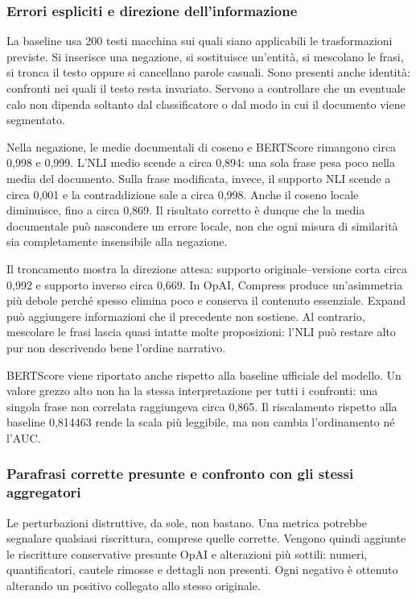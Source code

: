 \documentclass[11pt,a4paper]{article}
\begin{document}
\subsubsection{Errori espliciti e direzione dell'informazione}\label{errori-espliciti-e-direzione-dellinformazione}

La baseline usa 200 testi macchina sui quali siano applicabili le trasformazioni previste. Si inserisce una negazione, si sostituisce un'entità, si mescolano le frasi, si tronca il testo oppure si cancellano parole casuali. Sono presenti anche identità: confronti nei quali il testo resta invariato. Servono a controllare che un eventuale calo non dipenda soltanto dal classificatore o dal modo in cui il documento viene segmentato.

Nella negazione, le medie documentali di coseno e BERTScore rimangono circa 0,998 e 0,999. L'NLI medio scende a circa 0,894: una sola frase pesa poco nella media del documento. Sulla frase modificata, invece, il supporto NLI scende a circa 0,001 e la contraddizione sale a circa 0,998. Anche il coseno locale diminuisce, fino a circa 0,869. Il risultato corretto è dunque che la media documentale può nascondere un errore locale, non che ogni misura di similarità sia completamente insensibile alla negazione.

Il troncamento mostra la direzione attesa: supporto originale--versione corta circa 0,992 e supporto inverso circa 0,669. In OpAI, Compress produce un'asimmetria più debole perché spesso elimina poco e conserva il contenuto essenziale. Expand può aggiungere informazioni che il precedente non sostiene. Al contrario, mescolare le frasi lascia quasi intatte molte proposizioni: l'NLI può restare alto pur non descrivendo bene l'ordine narrativo.

BERTScore viene riportato anche rispetto alla baseline ufficiale del modello. Un valore grezzo alto non ha la stessa interpretazione per tutti i confronti: una singola frase non correlata raggiungeva circa 0,865. Il riscalamento rispetto alla baseline 0,814463 rende la scala più leggibile, ma non cambia l'ordinamento né l'AUC.

\subsubsection{Parafrasi corrette presunte e confronto con gli stessi aggregatori}\label{parafrasi-corrette-presunte-e-confronto-con-gli-stessi-aggregatori}

Le perturbazioni distruttive, da sole, non bastano. Una metrica potrebbe segnalare qualsiasi riscrittura, comprese quelle corrette. Vengono quindi aggiunte le riscritture conservative presunte OpAI e alterazioni più sottili: numeri, quantificatori, cautele rimosse e dettagli non presenti. Ogni negativo è ottenuto alterando un positivo collegato allo stesso originale.
\end{document}
